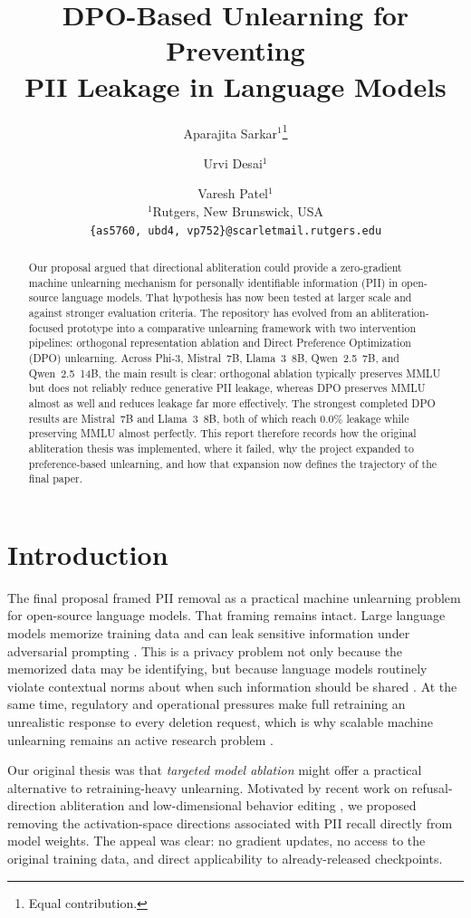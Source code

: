 \documentclass[11pt]{article}
\title{DPO-Based Unlearning for Preventing\\PII Leakage in Language Models}
\author{
Aparajita Sarkar$^1$\thanks{Equal contribution.} \and
Urvi Desai$^1$\footnotemark[1] \and
Varesh Patel$^1$\footnotemark[1] \\
$^1$Rutgers, New Brunswick, USA \\
\texttt{\{as5760, ubd4, vp752\}@scarletmail.rutgers.edu}
}
\begin{document}
\maketitle

\begin{abstract}
Our proposal argued that directional abliteration could provide a zero-gradient machine unlearning mechanism for personally identifiable information (PII) in open-source language models. That hypothesis has now been tested at larger scale and against stronger evaluation criteria. The repository has evolved from an abliteration-focused prototype into a comparative unlearning framework with two intervention pipelines: orthogonal representation ablation and Direct Preference Optimization (DPO) unlearning. Across Phi-3, Mistral~7B, Llama~3~8B, Qwen~2.5~7B, and Qwen~2.5~14B, the main result is clear: orthogonal ablation typically preserves MMLU but does not reliably reduce generative PII leakage, whereas DPO preserves MMLU almost as well and reduces leakage far more effectively. The strongest completed DPO results are Mistral~7B and Llama~3~8B, both of which reach 0.0\% leakage while preserving MMLU almost perfectly. This report therefore records how the original abliteration thesis was implemented, where it failed, why the project expanded to preference-based unlearning, and how that expansion now defines the trajectory of the final paper.
\end{abstract}

\section{Introduction}

The final proposal framed PII removal as a practical machine unlearning problem for open-source language models. That framing remains intact. Large language models memorize training data and can leak sensitive information under adversarial prompting \citep{carlini2021extracting, lukas2023analyzing}. This is a privacy problem not only because the memorized data may be identifying, but because language models routinely violate contextual norms about when such information should be shared \citep{brown2022does, mireshghallah2023can}. At the same time, regulatory and operational pressures make full retraining an unrealistic response to every deletion request, which is why scalable machine unlearning remains an active research problem \citep{bourtoule2021machine, golatkar2020eternal, tarun2023fast}.

Our original thesis was that \emph{targeted model ablation} might offer a practical alternative to retraining-heavy unlearning. Motivated by recent work on refusal-direction abliteration and low-dimensional behavior editing \citep{arditi2024refusal, heretic2025, agnihotri2025granular}, we proposed removing the activation-space directions associated with PII recall directly from model weights. The appeal was clear: no gradient updates, no access to the original training data, and direct applicability to already-released checkpoints.
\end{document}
